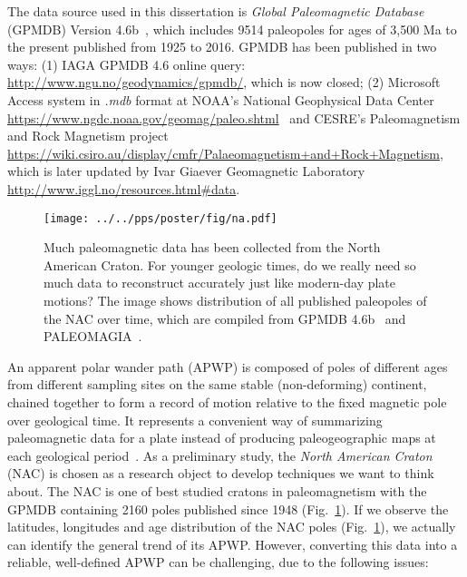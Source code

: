 The data source used in this dissertation is \emph{Global Paleomagnetic
Database} (GPMDB) Version 4.6b~\cite[updated in 2016 by the Ivar Giaever
Geomagnetic Laboratory team, in collaboration with Pisarevsky]{M96,P05}, which
includes 9514 paleopoles for ages of 3,500 Ma to the present published from 1925
to 2016. GPMDB has been published in two ways: (1) IAGA GPMDB 4.6 online query:
\url{http://www.ngu.no/geodynamics/gpmdb/}, which is now closed; (2) Microsoft
Access system in \emph{.mdb} format at NOAA's National Geophysical Data Center
\url{https://www.ngdc.noaa.gov/geomag/paleo.shtml}~\citep{P03}
and CESRE's Paleomagnetism and Rock Magnetism project
\url{https://wiki.csiro.au/display/cmfr/Palaeomagnetism+and+Rock+Magnetism},
which is later updated by Ivar Giaever Geomagnetic Laboratory
\url{http://www.iggl.no/resources.html\#data}.

\begin{figure}
  \centering
  \texttt{[image: ../../pps/poster/fig/na.pdf]}
  \captionsetup{width=.95\textwidth}
  \caption[All published paleomagnetic data from North America]{Much
paleomagnetic data has been collected from the North American Craton. For
younger geologic times, do we really need so much data to reconstruct accurately
just like modern-day plate motions? The image shows distribution of all
published paleopoles of the NAC over time, which are compiled from GPMDB
4.6b~\citep{P05} and PALEOMAGIA~\citep{V14}.}\label{Fig:chap_intro_nacpole}
\end{figure}

An apparent polar wander path (APWP) is composed of poles of different ages
from different sampling sites on the same stable (non-deforming) continent,
chained together to form a record of motion relative to the fixed magnetic pole
over geological time. It represents a convenient way of summarizing
paleomagnetic data for a plate instead of producing paleogeographic maps at
each geological period~\citep{T08}. As a preliminary study, the \emph{North
American Craton} (NAC) is chosen as a research object to develop techniques we
want to think about. The NAC is one of best studied cratons in paleomagnetism
with the GPMDB containing 2160 poles published since 1948
(Fig.~\ref{Fig:chap_intro_nacpole}). If we observe the latitudes, longitudes and
age distribution of the NAC poles (Fig.~\ref{Fig:chap_intro_nacpole}), we
actually can identify the general trend of its APWP\@. However, converting this
data into a reliable, well-defined APWP can be challenging, due to the following
issues:

